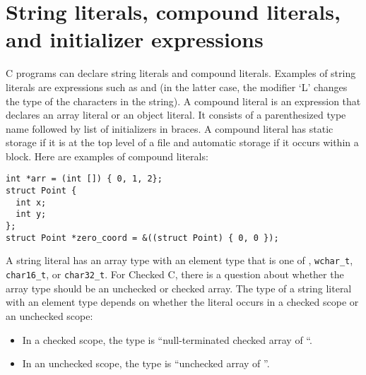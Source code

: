 \section{String literals, compound literals, and initializer expressions}

C programs can declare string literals and compound literals.  Examples
of string literals are expressions such as  and 
(in the latter case, the modifier `L' changes the type of the characters in the string).
A compound literal is an expression that declares an array literal or an object literal.
It consists of a parenthesized type name followed by list of initializers in braces.
A compound literal has static storage if it is at the top level of a file and automatic
storage if it occurs within a block.  Here are examples of compound literals:
\begin{lstlisting}
int *arr = (int []) { 0, 1, 2};
struct Point {
  int x;
  int y;
};
struct Point *zero_coord = &((struct Point) { 0, 0 });
\end{lstlisting}

A string literal has an array type with an element type that is one of ,
\lstinline+wchar_t+,  \lstinline+char16_t+, or \lstinline+char32_t+.   For Checked C, there is a question
about whether the array type should be an unchecked or checked array.
The type of a string literal with an element type  depends on whether the literal occurs
in a checked scope or an unchecked scope:
\begin{itemize}
\item In a checked scope, the type is ``null-terminated checked array of ``.
\item In an unchecked scope, the type is ``unchecked array of ''.
\end{itemize}


